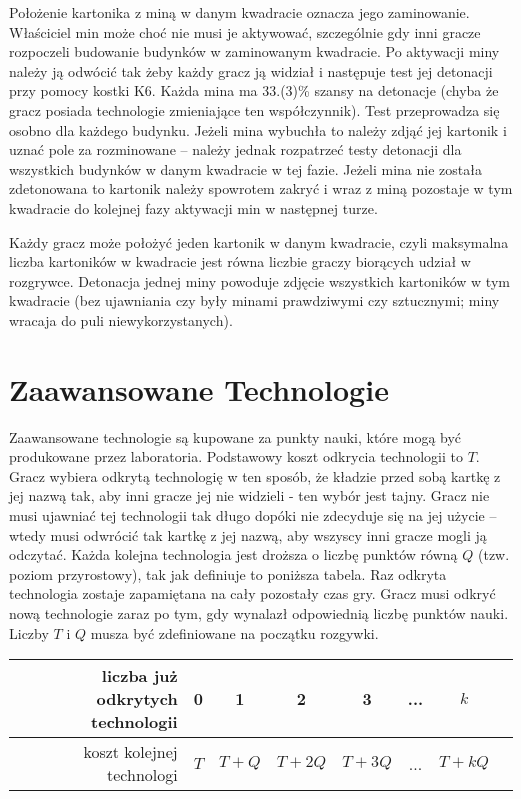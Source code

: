\documentclass[11pt,a4paper]{article}
\begin{document}
Położenie kartonika z miną w danym kwadracie oznacza jego zaminowanie. Właściciel min może choć nie musi je aktywować, szczególnie gdy inni gracze rozpoczeli budowanie budynków w zaminowanym kwadracie. Po aktywacji miny należy ją odwócić tak żeby każdy gracz ją widział i następuje test jej detonacji przy pomocy kostki K6. Każda mina ma 33.(3)\% szansy na detonacje (chyba że gracz posiada technologie zmieniające ten współczynnik). Test przeprowadza się osobno dla każdego budynku. Jeżeli mina wybuchła to należy zdjąć jej kartonik i uznać pole za rozminowane -- należy jednak rozpatrzeć testy detonacji dla wszystkich budynków w danym kwadracie w tej fazie. Jeżeli mina nie została zdetonowana to kartonik należy spowrotem zakryć i wraz z miną pozostaje w tym kwadracie do kolejnej fazy aktywacji min w następnej turze.

Każdy gracz może położyć jeden kartonik w danym kwadracie, czyli maksymalna liczba kartoników w kwadracie jest równa liczbie graczy biorących udział w rozgrywce. Detonacja jednej miny powoduje zdjęcie wszystkich kartoników w tym kwadracie (bez ujawniania czy były minami prawdziwymi czy sztucznymi; miny wracaja do puli niewykorzystanych).

\section{Zaawansowane Technologie}

Zaawansowane technologie są kupowane za punkty nauki, które mogą być produkowane przez laboratoria. Podstawowy koszt odkrycia technologii to $T$. Gracz wybiera odkrytą technologię w ten sposób, że kładzie przed sobą kartkę z jej nazwą tak, aby inni gracze jej nie widzieli - ten wybór jest tajny. Gracz nie musi ujawniać tej technologii tak długo dopóki nie zdecyduje się na jej użycie -- wtedy musi odwrócić tak kartkę z jej nazwą, aby wszyscy inni gracze mogli ją odczytać. Każda kolejna technologia jest droższa o liczbę punktów równą $Q$ (tzw. poziom przyrostowy), tak jak definiuje to poniższa tabela. Raz odkryta technologia zostaje zapamiętana na cały pozostały czas gry. Gracz musi odkryć nową technologie zaraz po tym, gdy wynalazł odpowiednią liczbę punktów nauki. Liczby $T$ i $Q$ musza być zdefiniowane na początku rozgywki.
\begin{center}
  \begin{tabular}{| r | c | c | c | c | c | c | c |}
    \hline
    liczba już odkrytych technologii & 0 & 1 & 2 & 3  & ... & $k$ \\
    \hline
    koszt kolejnej technologi & $T$ & $T+Q$ & $T+2Q$ & $T+3Q$ & ... & $T+kQ$ \\
    \hline
  \end{tabular}
\end{center}
\end{document}
